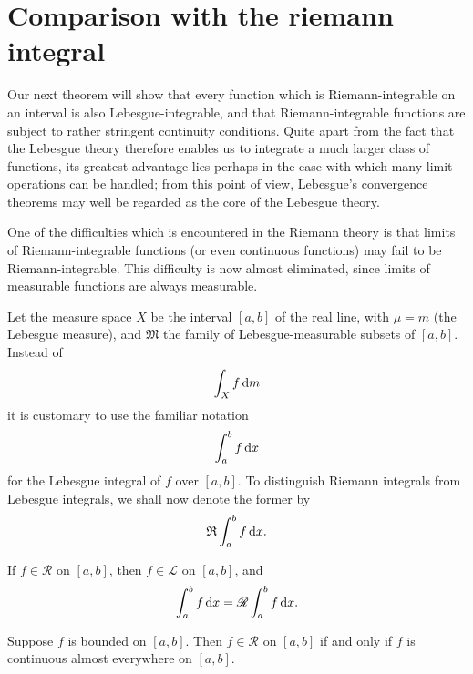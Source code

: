 
\section{Comparison with the riemann integral}

Our next theorem will show that every function which is Riemann-integrable
on an interval is also Lebesgue-integrable, 
and that Riemann-integrable functions are subject to rather stringent continuity conditions. 
Quite apart from the fact that the Lebesgue theory therefore enables us to integrate a much larger class of functions, 
its greatest advantage lies perhaps in the ease with which many limit operations can be handled; 
from this point of view, 
Lebesgue's convergence theorems may well be regarded as the core of the Lebesgue theory.


One of the difficulties which is encountered in the Riemann theory is
that limits of Riemann-integrable functions 
(or even continuous functions)
may fail to be Riemann-integrable. 
This difficulty is now almost eliminated,
since limits of measurable functions are always measurable.

Let the measure space $X$ be the interval $[a, b]$ of the real line, with $\mu = m$
(the Lebesgue measure), and $\mathfrak{M}$ the family of Lebesgue-measurable subsets
of $[a, b]$. Instead of
\begin{equation*}
    \int_X f \d m
\end{equation*}
it is customary to use the familiar notation
\begin{equation*}
    \int_{a}^{b} f \d x
\end{equation*}
for the Lebesgue integral of $f$ over $[a, b]$. 
To distinguish Riemann integrals from Lebesgue integrals, 
we shall now denote the former by
\begin{equation*}
    \mathfrak{R} \int_{a}^{b} f \d x .
\end{equation*}

\begin{thm}
    \label{thm:11.33}
    \begin{asparaenum}[(a)]
        \item If $f \in \mathscr{R}$ on $[a,b]$, then $f \in \mathscr{L}$ on $[a,b]$, 
        and 
        \begin{equation}
            \label{eq:11.87}
            \int_{a}^{b} f \d x = 
            \mathscr{R} \int_{a}^{b} f \d x .
        \end{equation}
        \item Suppose $f$ is bounded on $[a,b]$. 
        Then $f \in \mathscr{R}$ on $[a,b]$ 
        if and only if $f$ is continuous almost everywhere on $[a,b]$.
    \end{asparaenum}
\end{thm}